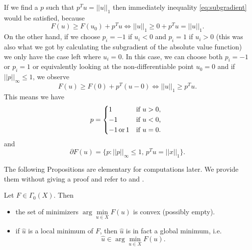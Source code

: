 \begin{example}
\begin{enumerate}
             If we find a $p$ such that $p^{T}u = ||u||_{1}$ then immediately inequality \ref{eq:subgradient} would be satisfied, because
                $$
                    F(u) \ge F(u_{0}) + p^{T} u \Longleftrightarrow ||u||_{1} \ge 0 + p^{T} u = ||u||_{1}.
                $$
            On the other hand, if we choose $p_{i} = -1$ if $u_{i} < 0$ and $p_{i} = 1$ if $u_{i} > 0$ (this was also what we got by calculating the subgradient of the absolute value function) we only have the case left where $u_{i} = 0$. In this case, we can choose both $p_{i} = -1$ or $p_{i} = 1$ or equivalently looking at the non-differentiable point $u_{0} = 0$ and if $||p||_{\infty} \le 1$, we observe
                $$
                    F(u) \ge F(0) + p^{T} (u - 0) \Longleftrightarrow ||u||_{1} \ge p^{T}u.
                $$
            This means we have
                $$
                    p =
                        \begin{dcases*}
                            1 & \textnormal{if $u > 0$,} \\
                            -1 & \textnormal{if $u < 0$,} \\
                            -1 \,\textnormal{or}\, 1 & \textnormal{if $u = 0$.}
                        \end{dcases*}
                $$
            and
                \begin{equation}
                    \partial F(u) = \big\{ p : ||p||_{\infty} \le 1, \, p^{T}u = ||x||_{1} \big\}.
                    \label{eq:subdifferential_of_l1_norm}
                \end{equation}
        \end{enumerate}
    \end{example}

    The following Propositions are elementary for computations later. We provide them without giving a proof and refer to \cite{Rockafellar} and \cite{Chambolle-et-al-10}.

    \begin{proposition} %

        Let $F \in \Gamma_{0}(X)$. Then

        \begin{itemize}
            \item the set of minimizers $\arg \min\limits_{u \in X} F(u)$ is convex (possibly empty).
            \item if $\hat{u}$ is a local minimum of $F$, then $\hat{u}$ is in fact a global minimum, i.e.
                $$
                    \hat{u} \in \arg \min_{u \in X} F(u).
                $$
        \end{itemize}

    \end{proposition}

